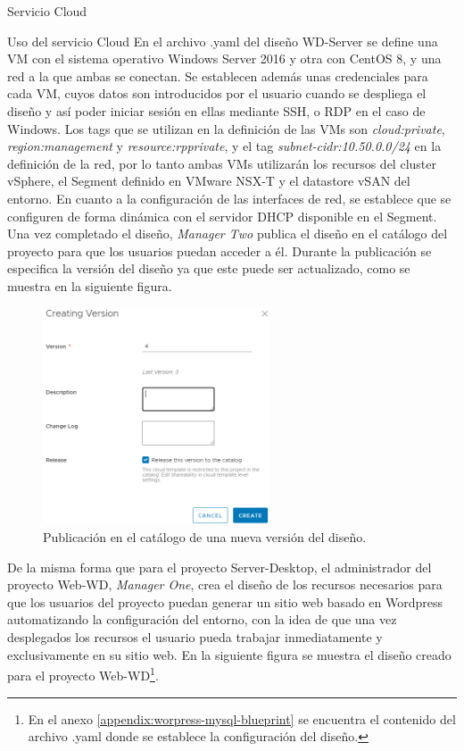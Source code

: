 \begin{subsection}{Servicio Cloud}
\begin{subsubsection}{Uso del servicio Cloud}
        En el archivo .yaml del diseño WD-Server se define una VM con el sistema operativo Windows Server 2016 y otra con CentOS 8, y una red a la que ambas se conectan. Se establecen además unas credenciales para cada VM, cuyos datos son introducidos por el usuario cuando se despliega el diseño y así poder iniciar sesión en ellas mediante SSH, o RDP en el caso de Windows. Los tags que se utilizan en la definición de las VMs son \textit{cloud:private}, \textit{region:management} y \textit{resource:rpprivate}, y el tag \textit{subnet-cidr:10.50.0.0/24} en la definición de la red, por lo tanto ambas VMs utilizarán los recursos del cluster vSphere, el Segment definido en VMware NSX-T y el datastore vSAN del entorno. En cuanto a la configuración de las interfaces de red, se establece que se configuren de forma dinámica con el servidor DHCP disponible en el Segment. Una vez completado el diseño, \textit{Manager Two} publica el diseño en el catálogo del proyecto para que los usuarios puedan acceder a él. Durante la publicación se especifica la versión del diseño ya que este puede ser actualizado, como se muestra en la siguiente figura.
        \begin{figure}[h]
            \centering
            \includegraphics[width=0.6\textwidth]{imaxes/pruebaconcepto/vrealize/create-version-blueprint.png}
            \caption{Publicación en el catálogo de una nueva versión del diseño.}
            \label{fig:publication-version}
        \end{figure}
        \FloatBarrier
        De la misma forma que para el proyecto Server-Desktop, el administrador del proyecto Web-WD, \textit{Manager One}, crea el diseño de los recursos necesarios para que los usuarios del proyecto puedan generar un sitio web basado en Wordpress automatizando la configuración del entorno, con la idea de que una vez desplegados los recursos el usuario pueda trabajar inmediatamente y exclusivamente en su sitio web. En la siguiente figura se muestra el diseño creado para el proyecto Web-WD\footnote{En el anexo \ref{appendix:worpress-mysql-blueprint} se encuentra el contenido del archivo .yaml donde se establece la configuración del diseño.}.

\end{subsubsection}
\end{subsection}
